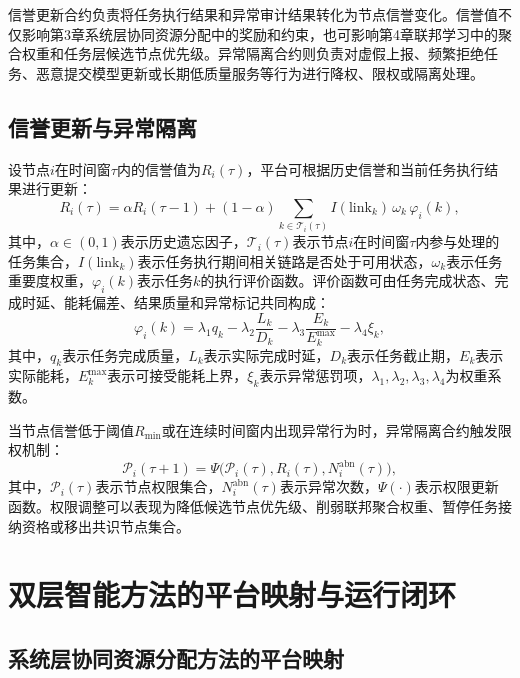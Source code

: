 信誉更新合约负责将任务执行结果和异常审计结果转化为节点信誉变化。信誉值不仅影响第3章系统层协同资源分配中的奖励和约束，也可影响第4章联邦学习中的聚合权重和任务层候选节点优先级。异常隔离合约则负责对虚假上报、频繁拒绝任务、恶意提交模型更新或长期低质量服务等行为进行降权、限权或隔离处理。

\subsection{信誉更新与异常隔离}

设节点\(i\)在时间窗\(\tau\)内的信誉值为\(R_i(\tau)\)，平台可根据历史信誉和当前任务执行结果进行更新：
\begin{equation}
  R_i(\tau)=\alpha R_i(\tau-1)+(1-\alpha)\sum_{k\in\mathcal{T}_i(\tau)} I(\mathrm{link}_k)\,\omega_k\,\varphi_i(k),
  \label{eq:rep_update}
\end{equation}
其中，\(\alpha\in(0,1)\)表示历史遗忘因子，\(\mathcal{T}_i(\tau)\)表示节点\(i\)在时间窗\(\tau\)内参与处理的任务集合，\(I(\mathrm{link}_k)\)表示任务执行期间相关链路是否处于可用状态，\(\omega_k\)表示任务重要度权重，\(\varphi_i(k)\)表示任务\(k\)的执行评价函数。评价函数可由任务完成状态、完成时延、能耗偏差、结果质量和异常标记共同构成：
\begin{equation}
  \varphi_i(k)=\lambda_1 q_k-\lambda_2 \frac{L_k}{D_k}-\lambda_3 \frac{E_k}{E_k^{\max}}-\lambda_4 \xi_k,
  \label{eq:exec_score}
\end{equation}
其中，\(q_k\)表示任务完成质量，\(L_k\)表示实际完成时延，\(D_k\)表示任务截止期，\(E_k\)表示实际能耗，\(E_k^{\max}\)表示可接受能耗上界，\(\xi_k\)表示异常惩罚项，\(\lambda_1,\lambda_2,\lambda_3,\lambda_4\)为权重系数。

当节点信誉低于阈值\(R_{\min}\)或在连续时间窗内出现异常行为时，异常隔离合约触发限权机制：
\begin{equation}
  \mathcal{P}_i(\tau+1)=\Psi\big(\mathcal{P}_i(\tau),R_i(\tau),N_i^{\mathrm{abn}}(\tau)\big),
  \label{eq:permission_update}
\end{equation}
其中，\(\mathcal{P}_i(\tau)\)表示节点权限集合，\(N_i^{\mathrm{abn}}(\tau)\)表示异常次数，\(\Psi(\cdot)\)表示权限更新函数。权限调整可以表现为降低候选节点优先级、削弱联邦聚合权重、暂停任务接纳资格或移出共识节点集合。

\section{双层智能方法的平台映射与运行闭环}
\label{sec:method_mapping}

\subsection{系统层协同资源分配方法的平台映射}

